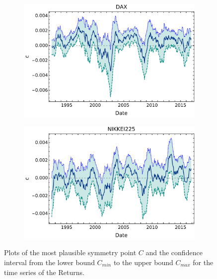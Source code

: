 \documentclass{elsarticle}
\begin{document}
\begin{figure}[h!tb]
\begin{subfigure}[b]{0.44\textwidth}
            \label{fig:SymmReturns005IPC}
        \end{subfigure}
        \begin{subfigure}[b]{0.44\textwidth}
            \centering 
            \includegraphics[width=\textwidth]{figures/SimmReturns/Simetria_DAX_CL005.pdf}
            \label{fig:SymmReturns005DAX}
            \end{subfigure}
        \quad
        \begin{subfigure}[b]{0.44\textwidth}
            \centering 
            \includegraphics[width=\textwidth]{figures/SimmReturns/Simetria_NIKKEI_CL005.pdf}
            \label{fig:SymmReturns005Nikkei}
        \end{subfigure}
        \caption[Plots of the most plausible symmetry point $C$ and the confidence interval ]
        {\small Plots of the most plausible symmetry point $C$ and the confidence interval from the lower bound $C_{min}$ to the upper bound $C_{max}$ for the time series of the Returns. } 
        \label{fig:SymmReturns005}
\end{figure}
    
\end{document}
